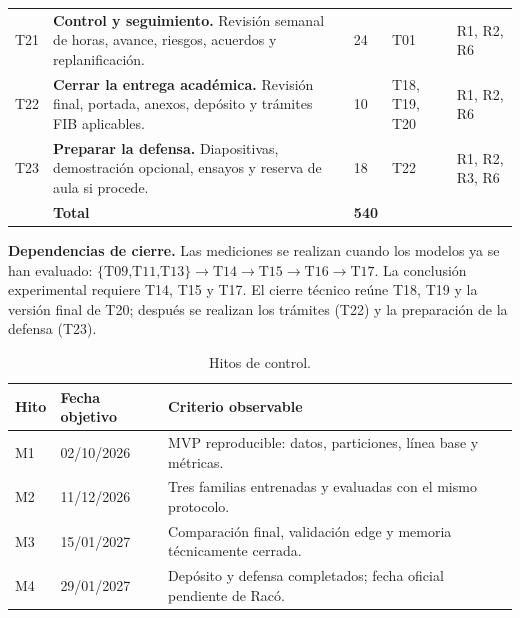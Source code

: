 \documentclass[10pt,a4paper]{article}
\newcommand{\task}[1]{\textbf{#1}}
\begin{document}
\begin{table}[h]
\begin{tabularx}{\textwidth}{C{0.9cm}Y C{0.65cm} L{1.65cm} L{1.85cm}}
T21 & \task{Control y seguimiento.} Revisión semanal de horas, avance, riesgos, acuerdos y replanificación. & 24 & T01 & R1, R2, R6 \\
T22 & \task{Cerrar la entrega académica.} Revisión final, portada, anexos, depósito y trámites FIB aplicables. & 10 & T18, T19, T20 & R1, R2, R6 \\
T23 & \task{Preparar la defensa.} Diapositivas, demostración opcional, ensayos y reserva de aula si procede. & 18 & T22 & R1, R2, R3, R6 \\
\midrule
 & \textbf{Total} & \textbf{540} & & \\
\bottomrule
\end{tabularx}
\end{table}

\textbf{Dependencias de cierre.} Las mediciones se realizan cuando los modelos ya se han evaluado: \(\{\text{T09,T11,T13}\}\rightarrow\text{T14}\rightarrow\text{T15}\rightarrow\text{T16}\rightarrow\text{T17}\). La conclusión experimental requiere T14, T15 y T17. El cierre técnico reúne T18, T19 y la versión final de T20; después se realizan los trámites (T22) y la preparación de la defensa (T23).

\begin{table}[h]
\centering
\caption{Hitos de control.}
\small
\begin{tabularx}{\textwidth}{L{1.4cm}L{2.7cm}Y}
\toprule
\textbf{Hito} & \textbf{Fecha objetivo} & \textbf{Criterio observable} \\
\midrule
M1 & 02/10/2026 & MVP reproducible: datos, particiones, línea base y métricas. \\
M2 & 11/12/2026 & Tres familias entrenadas y evaluadas con el mismo protocolo. \\
M3 & 15/01/2027 & Comparación final, validación edge y memoria técnicamente cerrada. \\
M4 & 29/01/2027 & Depósito y defensa completados; fecha oficial pendiente de Racó. \\
\bottomrule
\end{tabularx}
\end{table}
\end{document}
